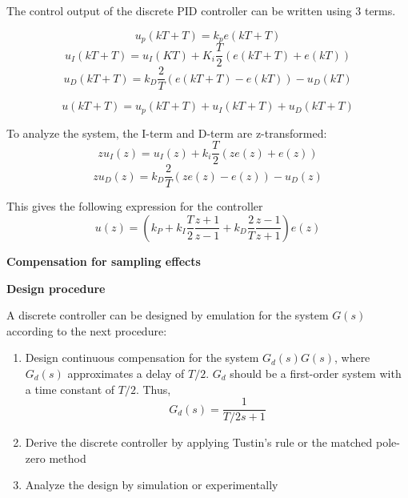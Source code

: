 The control output of the discrete PID controller can be written using 3 terms.

$$u_p(kT+T) = k_p e(kT+T)$$
$$u_I(kT+T) = u_I(KT)+K_i \frac{T}{2} (e(kT+T)+e(kT))$$
$$u_D(kT+T) = k_D \frac{2}{T} (e(kT+T)-e(kT))-u_D(kT)$$

$$u(kT+T) = u_p(kT+T)+u_I(kT+T)+u_D(kT+T)$$

To analyze the system, the I-term and D-term are z-transformed:
$$z u_I(z) = u_I(z) + k_i \frac{T}{2} (ze(z)+e(z))$$
$$z u_D(z) = k_D \frac{2}{T} (ze(z)-e(z))-u_D(z)$$

This gives the following expression for the controller
$$u(z) = (k_P+k_I \frac{T}{2} \frac{z+1}{z-1}+k_D \frac{2}{T} \frac{z-1}{z+1})e(z)$$


\textbf{Compensation for sampling effects}

\textbf{Design procedure}

A discrete controller can be designed by emulation for the system $G(s)$ according to the next procedure:

\begin{enumerate}
	\item{Design continuous compensation for the system $G_d(s)G(s)$, where $G_d(s)$ approximates a delay of $T/2$. $G_d$ should be a first-order system with a time constant of $T/2$.
	            Thus, $$G_d(s) = \frac{1}{T/2s+1}$$}
	\item{Derive the discrete controller by applying Tustin's rule or the matched pole-zero method}
	\item{Analyze the design by simulation or experimentally}
\end{enumerate}




